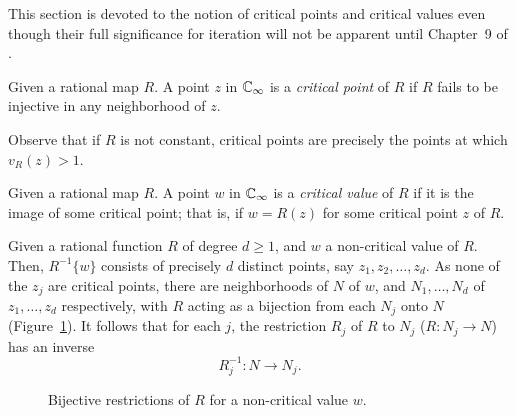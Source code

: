 This section is devoted to the notion of critical points and critical values
even though their full significance for iteration will not be apparent until
Chapter~9 of \cite{Beardon1991}.

\begin{definition}
    Given a rational map $R$. A point $z$ in $\mathbb{C}_\infty$ is a \emph{critical point}
    of $R$ if $R$ fails to be injective in any neighborhood of $z$.
\end{definition}

\begin{remark}
    Observe that if $R$ is not constant, critical points are precisely the
    points at which $v_R(z) > 1$.
\end{remark}

\begin{definition}
    Given a rational map $R$. A point $w$ in $\mathbb{C}_\infty$ is a \emph{critical value}
    of $R$ if it is the image of some critical point; that is, if $w = R(z)$ for
    some critical point $z$ of $R$.
\end{definition}

\begin{remark}
    Given a rational function $R$ of degree $d \geq 1$, and $w$ a non-critical
    value of $R$. Then, $R^{-1}\{w\}$ consists of precisely $d$ distinct points,
    say $z_1, z_2, \dots, z_d$. As none of the $z_j$ are critical points, there
    are neighborhoods of $N$ of $w$, and $N_1, \ldots, N_d$ of $z_1, \ldots,
    z_d$ respectively, with $R$ acting as a bijection from each $N_j$ onto $N$
    (Figure~\ref{fig:bijective_restrictions_of_R_for_non_critical_value}). It
    follows that for each $j$, the restriction $R_j$ of $R$ to $N_j$ ($R: N_j
    \to N$) has an inverse
    \begin{equation*}
        R_j^{-1} : N \to N_j.
    \end{equation*}
\end{remark}

\begin{figure}
    \centering
    \resizebox{0.6\textwidth}{!}{}
    \caption{Bijective restrictions of $R$ for a non-critical value $w$.}
    \label{fig:bijective_restrictions_of_R_for_non_critical_value}
\end{figure}

